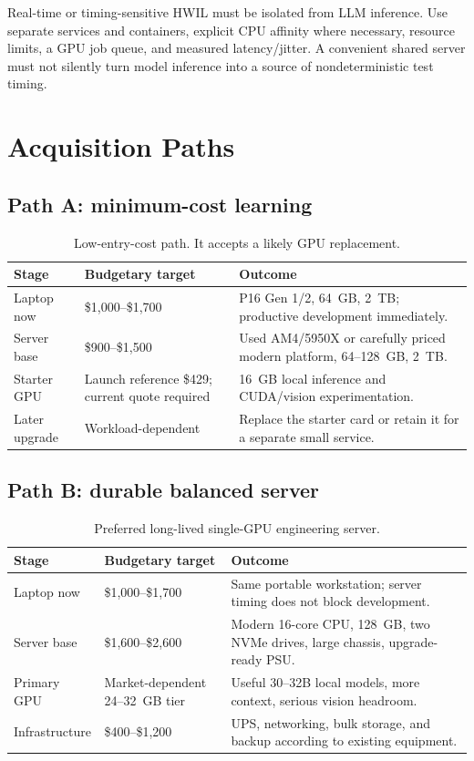 \documentclass[11pt]{article}
\begin{document}
Real-time or timing-sensitive HWIL must be isolated from LLM inference. Use
separate services and containers, explicit CPU affinity where necessary, resource
limits, a GPU job queue, and measured latency/jitter. A convenient shared server
must not silently turn model inference into a source of nondeterministic test
timing.

\section{Acquisition Paths}

\subsection{Path A: minimum-cost learning}

\begin{table}[htbp]
\centering
\small
\begin{tabularx}{\textwidth}{L{0.23\textwidth} L{0.20\textwidth} Y}
\toprule
Stage & Budgetary target & Outcome \\
\midrule
Laptop now & \$1,000--\$1,700 & P16 Gen 1/2, 64~GB, 2~TB; productive development immediately. \\
Server base & \$900--\$1,500 & Used AM4/5950X or carefully priced modern platform, 64--128~GB, 2~TB. \\
Starter GPU & Launch reference \$429; current quote required & 16~GB local inference and CUDA/vision experimentation. \\
Later upgrade & Workload-dependent & Replace the starter card or retain it for a separate small service. \\
\bottomrule
\end{tabularx}
\caption{Low-entry-cost path. It accepts a likely GPU replacement.}
\end{table}

\subsection{Path B: durable balanced server}

\begin{table}[htbp]
\centering
\small
\begin{tabularx}{\textwidth}{L{0.23\textwidth} L{0.20\textwidth} Y}
\toprule
Stage & Budgetary target & Outcome \\
\midrule
Laptop now & \$1,000--\$1,700 & Same portable workstation; server timing does not block development. \\
Server base & \$1,600--\$2,600 & Modern 16-core CPU, 128~GB, two NVMe drives, large chassis, upgrade-ready PSU. \\
Primary GPU & Market-dependent 24--32~GB tier & Useful 30--32B local models, more context, serious vision headroom. \\
Infrastructure & \$400--\$1,200 & UPS, networking, bulk storage, and backup according to existing equipment. \\
\bottomrule
\end{tabularx}
\caption{Preferred long-lived single-GPU engineering server.}
\end{table}
\end{document}
